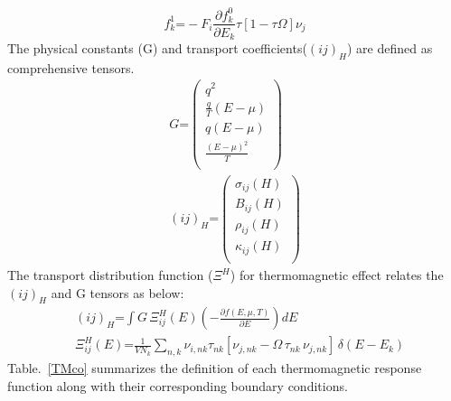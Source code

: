 \begin{equation}
f_{k}^{1}\textbf{=}-F_{i}\frac{\partial f_{k}^{0}}{\partial E_{k}}\tau [1-\tau \Omega]\nu _{j}
\label{eq5}
\end{equation}
The physical constants (G) and transport coefficients($(ij)_{H}$) are defined as comprehensive tensors. 
\begin{equation}
    \begin{split}
    G\textbf{=}\begin{pmatrix}
q^2 \\
\frac{q}{T}(E-\mu) \\
q(E-\mu) \\
\frac{(E-\mu)^2}{T} \\
\end{pmatrix} \\
(ij)_{H}\textbf{=}\begin{pmatrix}
\sigma_{ij}(H) \\
B_{ij}(H) \\
\rho _{ij}(H) \\
\kappa _{ij} (H) \\
\end{pmatrix} 
\label{eqmtrx}
    \end{split}
\end{equation}
The transport distribution function ($\Xi ^H$) for thermomagnetic effect relates the $(ij)_H$ and G tensors as below:
\begin{equation}
    \begin{split}
        &(ij)_H\textbf{=}\int G \, \Xi_{ij}^H (E)\left(-\frac{\partial f(E,\mu,T)}{\partial E}\right) dE \\
     &\Xi_{ij}^H(E)\textbf{=}\frac{1}{VN_k}\sum_{n,k}\nu_{i,nk}\tau_{nk}[\nu_{j,nk}-\Omega\,\tau_{nk}\,\nu_{j,nk}]\,\delta(E-E_{k})
        \label{eq6}
    \end{split}
\end{equation}
Table.~\ref{TMco} summarizes the definition of each thermomagnetic response function along with their corresponding boundary conditions.
